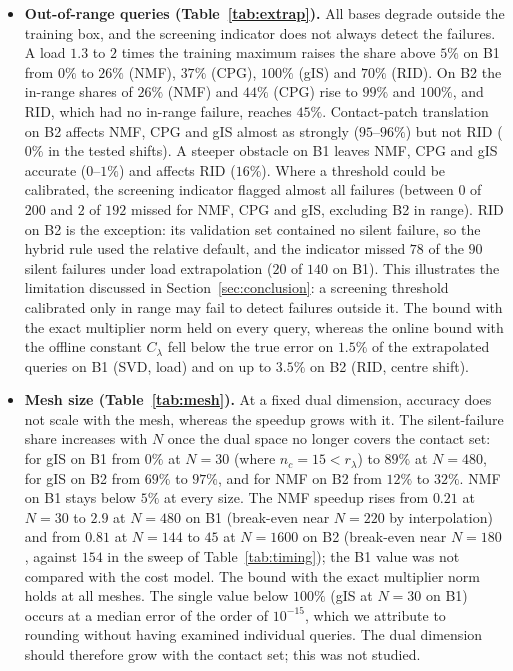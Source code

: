 \documentclass[11pt,a4paper]{article}
\begin{document}
\begin{itemize}
\item
  \textbf{Out-of-range queries (Table~\ref{tab:extrap}).} All bases degrade outside the training box, and the screening indicator does not always detect the failures. A load $1.3$ to $2$ times the training maximum raises the share above $5\%$ on B1 from $0\%$ to $26\%$ (NMF), $37\%$ (CPG), $100\%$ (gIS) and $70\%$ (RID). On B2 the in-range shares of $26\%$ (NMF) and $44\%$ (CPG) rise to $99\%$ and $100\%$, and RID, which had no in-range failure, reaches $45\%$. Contact-patch translation on B2 affects NMF, CPG and gIS almost as strongly ($95$--$96\%$) but not RID ($0\%$ in the tested shifts). A steeper obstacle on B1 leaves NMF, CPG and gIS accurate ($0$--$1\%$) and affects RID ($16\%$). Where a threshold could be calibrated, the screening indicator flagged almost all failures (between $0$ of $200$ and $2$ of $192$ missed for NMF, CPG and gIS, excluding B2 in range). RID on B2 is the exception: its validation set contained no silent failure, so the hybrid rule used the relative default, and the indicator missed $78$ of the $90$ silent failures under load extrapolation ($20$ of $140$ on B1). This illustrates the limitation discussed in Section~\ref{sec:conclusion}: a screening threshold calibrated only in range may fail to detect failures outside it. The bound with the exact multiplier norm held on every query, whereas the online bound with the offline constant $C_\lambda$ fell below the true error on $1.5\%$ of the extrapolated queries on B1 (SVD, load) and on up to $3.5\%$ on B2 (RID, centre shift).
\item
  \textbf{Mesh size (Table~\ref{tab:mesh}).} At a fixed dual dimension, accuracy does not scale with the mesh, whereas the speedup grows with it. The silent-failure share increases with $N$ once the dual space no longer covers the contact set: for gIS on B1 from $0\%$ at $N = 30$ (where $n_c = 15 < r_\lambda$) to $89\%$ at $N = 480$, for gIS on B2 from $69\%$ to $97\%$, and for NMF on B2 from $12\%$ to $32\%$. NMF on B1 stays below $5\%$ at every size. The NMF speedup rises from $0.21$ at $N = 30$ to $2.9$ at $N = 480$ on B1 (break-even near $N = 220$ by interpolation) and from $0.81$ at $N = 144$ to $45$ at $N = 1600$ on B2 (break-even near $N = 180$, against $154$ in the sweep of Table~\ref{tab:timing}); the B1 value was not compared with the cost model. The bound with the exact multiplier norm holds at all meshes. The single value below $100\%$ (gIS at $N = 30$ on B1) occurs at a median error of the order of $10^{-15}$, which we attribute to rounding without having examined individual queries. The dual dimension should therefore grow with the contact set; this was not studied.

\end{itemize}
\end{document}
